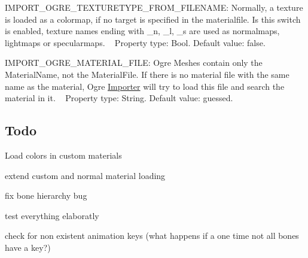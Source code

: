 \begin{DoxyItemize}
\item I\+M\+P\+O\+R\+T\+\_\+\+O\+G\+R\+E\+\_\+\+T\+E\+X\+T\+U\+R\+E\+T\+Y\+P\+E\+\_\+\+F\+R\+O\+M\+\_\+\+F\+I\+L\+E\+N\+A\+M\+E\+: Normally, a texture is loaded as a colormap, if no target is specified in the materialfile. Is this switch is enabled, texture names ending with \+\_\+n, \+\_\+l, \+\_\+s are used as normalmaps, lightmaps or specularmaps. ~\newline
 Property type\+: Bool. Default value\+: false.
\item I\+M\+P\+O\+R\+T\+\_\+\+O\+G\+R\+E\+\_\+\+M\+A\+T\+E\+R\+I\+A\+L\+\_\+\+F\+I\+L\+E\+: Ogre Meshes contain only the Material\+Name, not the Material\+File. If there is no material file with the same name as the material, Ogre \hyperlink{class_importer}{Importer} will try to load this file and search the material in it. ~\newline
 Property type\+: String. Default value\+: guessed.
\end{DoxyItemize}\hypertarget{importer_notes_todo}{}\subsection{Todo}\label{importer_notes_todo}

\begin{DoxyItemize}
\item Load colors in custom materials
\item extend custom and normal material loading
\item fix bone hierarchy bug
\item test everything elaboratly
\item check for non existent animation keys (what happens if a one time not all bones have a key?) 
\end{DoxyItemize}
